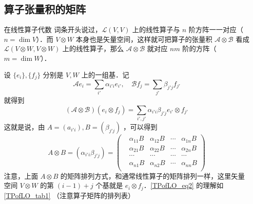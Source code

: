\subsection{算子张量积的矩阵}
在线性算子代数 词条开头说过，$\mathcal L(V,V)$ 上的线性算子与 $n$ 阶方阵一一对应（ $n=\dim V$）．而 $V\otimes W$ 本身也是矢量空间，这样就可把算子的张量积 $\mathcal A\otimes \mathcal B$ 看成 $\mathcal L(V\otimes W,V\otimes W)$ 上的线性算子，那么 $\mathcal A\otimes \mathcal B$ 就对应 $nm$ 阶的方阵（$m=\dim W$）．

设 $\{e_i\},\{f_j\}$ 分别是 $V,W$ 上的一组基．记
\begin{equation}
\mathcal Ae_i=\sum_{i'}\alpha_{i'i}e_{i'},\quad \mathcal Bf_j=\sum_{j'}\beta_{j'j}f_{j'}
\end{equation}
就得到
\begin{equation}
(\mathcal A\otimes \mathcal B)(e_i\otimes f_j)=\sum_{i',j'}\alpha_{i'i}\beta_{j'j}e_{i'}\otimes f_{j'}
\end{equation}
这就是说，由 $A=(a_{i'i}),B=(\beta_{j'j})$ ，可以得到
\begin{equation}\label{TPofLO_eq2}
A\otimes B=(\alpha_{i'i}\beta_{j'j})=
\begin{pmatrix}
&\alpha_{11}B&\alpha_{12}B&\cdots&\alpha_{1n}B\\
&\alpha_{21}B&\alpha_{22}B&\cdots&\alpha_{2n}B\\
&\cdots&\cdots&\cdots&\cdots\\
&\alpha_{n1}B&\alpha_{n2}B&\cdots&\alpha_{nn}B\\
\end{pmatrix}
\end{equation}
注意，上面 $A\otimes B$ 的矩阵排列方式，和通常线性算子的矩阵排列一样，这里矢量空间 $V\otimes W$ 的第 $(i-1)+j$ 个基就是 $e_i\otimes f_j$．\autoref{TPofLO_eq2} 的理解如\autoref{TPofLO_tab1} （注意算子矩阵的排列表）

